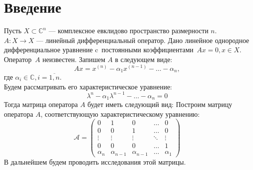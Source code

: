 \section{Введение}
Пусть $X \subset \mathbb{C}^n$ --- комплексное евклидово пространство размерности $n$. \\
$A: X \rightarrow X$ --- линейный дифференциальный оператор. 
Дано линейное однородное дифференциальное уравнение c~постоянными коэффициентами~${Ax = 0, x \in X}$. 
Оператор~$A$ неизвестен.
Запишем $A$ в следующем виде:
$$
	Ax = x^{(n)} - \alpha_{1}x^{(n-1)} - \ldots - \alpha_{n},
$$
где $\alpha_{i} \in \mathbb{C}, i = \overline{1,n}$. \\
Будем рассматривать его характеристическое уравнение:
$$
	\lambda^n - \alpha_{1}\lambda^{n-1} - \ldots - \alpha_{n} = 0
$$ 
Тогда матрица оператора $A$ будет иметь следующий вид:
Построим матрицу оператора $A$, соответствующую характеристическому уравнению:
$$
	\mathcal{A} = \begin{pmatrix}
		0 & 1 & 0 & \dots & 0 \\
		0 & 0 & 1 & \dots & 0 \\
		\vdots & \vdots & \vdots & \ddots & \vdots \\
		0 & 0 & 0 & \dots & 1 \\
		\alpha_n & \alpha_{n-1} & \alpha_{n-1} & \dots & \alpha_1
	\end{pmatrix}
$$
В дальнейшем будем проводить исследования этой матрицы.